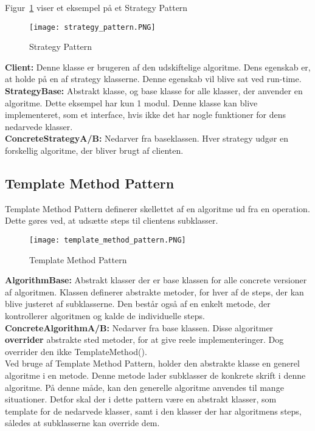 \documentclass[../SWD_disp.tex]{subfiles}
\begin{document}
Figur~\ref{fig:strategy_pattern} viser et eksempel på et Strategy Pattern

\begin{figure}[H]
    \centering
    \texttt{[image: strategy\_pattern.PNG]}
    \caption{Strategy Pattern}
    \label{fig:strategy_pattern}
\end{figure}

\textbf{Client:} Denne klasse er brugeren af den udskiftelige algoritme. Dens egenskab er, at holde på en af strategy klasserne. Denne egenskab vil blive sat ved run-time.
\\

\textbf{StrategyBase:} Abstrakt klasse, og base klasse for alle klasser, der anvender en algoritme. Dette eksempel har kun 1 modul. Denne klasse kan blive implementeret, som et interface, hvis ikke det har nogle funktioner for dens nedarvede klasser.
\\

\textbf{ConcreteStrategyA/B:} Nedarver fra baseklassen. Hver strategy udgør en forskellig algoritme, der bliver brugt af clienten.

\subsection*{Template Method Pattern}
Template Method Pattern definerer skellettet af en algoritme ud fra en operation. Dette gøres ved, at udsætte steps til clientens subklasser.

\begin{figure}[H]
    \centering
    \texttt{[image: template\_method\_pattern.PNG]}
    \caption{Template Method Pattern}
    \label{fig:template_method_pattern}
\end{figure}

\textbf{AlgorithmBase:} Abstrakt klasser der er base klassen for alle concrete versioner af algoritmen. Klassen definerer abstrakte metoder, for hver af de steps, der kan blive justeret af subklasserne. Den består også af en enkelt metode, der kontrollerer algoritmen og kalde de individuelle steps.
\\

\textbf{ConcreteAlgorithmA/B:} Nedarver fra base klassen. Disse algoritmer \textbf{overrider} abstrakte sted metoder, for at give reele implementeringer. Dog overrider den ikke TemplateMethod().
\\

Ved bruge af Template Method Pattern, holder den abstrakte klasse en generel algoritme i en metode. Denne metode lader subklasser de konkrete skrift i denne algoritme. På denne måde, kan den generelle algoritme anvendes til mange situationer. Detfor skal der i dette pattern være en abstrakt klasser, som template for de nedarvede klasser, samt i den klasser der har algoritmens steps, således at subklasserne kan override dem.
\end{document}
